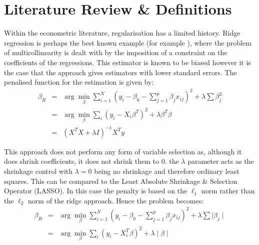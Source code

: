 \documentclass[11pt]{article}
\begin{document}
\section{Literature Review \& Definitions}
Within the econometric literature, regularisation has a limited history. Ridge regression is perhaps the best known example (for example \cite{hoerl1970}), where the problem of multicollinearity is dealt with by the imposition of a constraint on the coefficients of the regressions. This estimator is known to be biased however it is the case that the approach gives estimators with lower standard errors. The penalised function for the estimation is given by:
\begin{eqnarray}
\beta_R&=&\arg\min_\beta \sum_{i=1}^N(y_i-\beta_0-\sum_{j=1}^p \beta_j x_{ij})^2+\lambda \sum \beta_j^2\\
&=&\arg\min_\beta \sum_i \left(y_i-X_i\beta^T\right)^2+\lambda\beta^T\beta \nonumber \\
&=&\left(X^TX+\lambda I\right)^{-1}X^T y \nonumber
\end{eqnarray}

This approach does not perform any form of variable selection  as, although it does shrink coefficients, it does not shrink them to 0. the $\lambda$ parameter acts as the shrinkage control with $\lambda=0$ being no shrinkage and therefore ordinary least squares. This can be compared to the Least Absolute Shrinkage \& Selection Operator (LASSO). In this case the penalty is based on the $\ell_1$ norm rather than the $\ell_2$ norm of the ridge approach. Hence the problem becomes:
\begin{eqnarray}
\beta_R&=&\arg\min_\beta \sum_{i=1}^N(y_i-\beta_0-\sum_{j=1}^p \beta_j x_{ij})^2+\lambda \sum \mid\beta_j\mid\\
&=&\arg\min_\beta \sum_i \left(y_i-X_i^T\beta\right)^2+\lambda\mid\beta\mid \nonumber 
\end{eqnarray}\label{lassodef}
\end{document}
